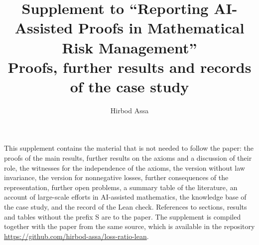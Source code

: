 \documentclass[11pt,a4paper]{article}
\title{\textbf{Supplement to ``Reporting AI-Assisted Proofs in Mathematical Risk Management''}\\[4pt]
  \large Proofs, further results and records of the case study}
\author{Hirbod Assa}
\date{}
\begin{document}
\maketitle

\noindent This supplement contains the material that is not needed to follow the paper: the
proofs of the main results, further results on the axioms and a discussion of their role, the witnesses for
the independence of the axioms, the version without law invariance, the
version for nonnegative losses, further consequences of the representation, further open problems, a summary table of the literature, an
account of large-scale efforts in AI-assisted mathematics, the knowledge base of the case study, and the record of the Lean check. References to sections, results and tables without the prefix S are to the
paper. The supplement is compiled together with the paper from the same source, which is available in the
repository \url{https://github.com/hirbod-assa/loss-ratio-lean}.

\tableofcontents


















\end{document}
